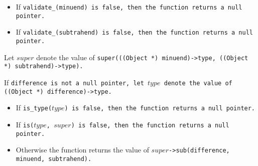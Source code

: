 \begin{itemize}

\item If \tt{validate_(minuend)} is \tt{false},
then the function returns a null pointer.

\item If \tt{validate_(subtrahend)} is \tt{false},
then the function returns a null pointer.

\end{itemize}

Let $super$ denote the value of
\tt{super(((Object *) minuend)->type, ((Object *) subtrahend)->type)}.

If \tt{difference} is not a null pointer, let $type$
denote the value of \tt{((Object *) difference)->type}.

\begin{itemize}

\item If \tt{is_type(}$type$\tt{)} is \tt{false},
then the function returns a null pointer.

\item If \tt{is(}$type$\tt{,} $super$\tt{)} is \tt{false},
then the function returns a null pointer.

\item Otherwise the function returns the value
of $super$\tt{->sub(difference, minuend, subtrahend)}.

\end{itemize}
